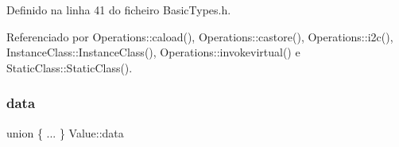 Definido na linha 41 do ficheiro Basic\+Types.\+h.



Referenciado por Operations\+::caload(), Operations\+::castore(), Operations\+::i2c(), Instance\+Class\+::\+Instance\+Class(), Operations\+::invokevirtual() e Static\+Class\+::\+Static\+Class().

\mbox{\label{structValue_a2835134be157447a3ceda1a1e839ba9e}} 
\subsubsection{\texorpdfstring{data}{data}}
{\footnotesize\ttfamily union \{ ... \}   Value\+::data}



